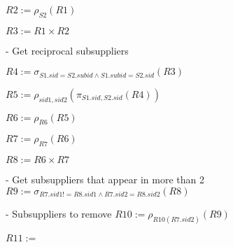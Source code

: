 \documentclass[10pt]{article}
\begin{document}
$R2 := \rho_{S2}(R1)$

$R3 := R1 \times R2$

- Get reciprocal subsuppliers

$R4 := \sigma_{S1.sid = S2.subid \wedge S1.subid = S2.sid}(R3)$

$R5 := \rho_{sid1, sid2}(\pi_{S1.sid, S2.sid}(R4))$

$R6 := \rho_{R6}(R5)$

$R7 := \rho_{R7}(R6)$

$R8 := R6 \times R7$

- Get subsuppliers that appear in more than 2
$R9 := \sigma_{R7.sid1 != R8.sid1 \wedge R7.sid2 = R8.sid2}(R8)$

- Subsuppliers to remove
$R10 := \rho_{R10(R7.sid2)}(R9)$

$R11 := $
\\~\\
\end{document}
